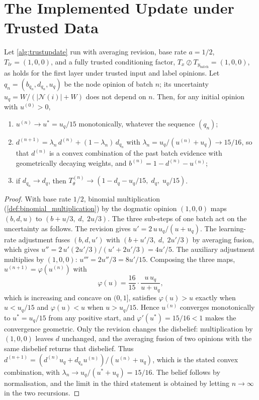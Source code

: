 \section{The Implemented Update under Trusted Data}

\begin{theorem}\label{thm:implemented}
Let \cref{alg:trustupdate} run with averaging revision, base rate $a = 1/2$, $T_{lr} = (1, 0, 0)$, and a fully trusted conditioning factor, $T_x \oslash T_{y_\text{batch}} = (1, 0, 0)$, as holds for the first layer under trusted input and label opinions. Let $q_n = (b_{q_n}, d_{q_n}, u_q)$ be the node opinion of batch $n$; its uncertainty $u_q = W / (|\mathcal{N}(i)| + W)$ does not depend on $n$. Then, for any initial opinion with $u^{(0)} > 0$,
\begin{enumerate}
    \item $u^{(n)} \to u^* = u_q / 15$ monotonically, whatever the sequence $(q_n)$;
    \item $d^{(n+1)} = \lambda_n\, d^{(n)} + (1 - \lambda_n)\, d_{q_n}$ with $\lambda_n = u_q / (u^{(n)} + u_q) \to 15/16$, so that $d^{(n)}$ is a convex combination of the past batch evidence with geometrically decaying weights, and $b^{(n)} = 1 - d^{(n)} - u^{(n)}$;
    \item if $d_{q_n} \to d_q$, then $T_\theta^{(n)} \to (1 - d_q - u_q/15,\; d_q,\; u_q/15)$.
\end{enumerate}
\end{theorem}
\begin{proof}
With base rate $1/2$, binomial multiplication (\cref{def:binomial_multiplication}) by the dogmatic opinion $(1,0,0)$ maps $(b, d, u)$ to $(b + u/3,\; d,\; 2u/3)$. The three sub-steps of one batch act on the uncertainty as follows. The revision gives $u' = 2\, u\, u_q / (u + u_q)$. The learning-rate adjustment fuses $(b, d, u')$ with $(b + u'/3,\; d,\; 2u'/3)$ by averaging fusion, which gives $u'' = 2\, u' (2u'/3) / (u' + 2u'/3) = 4u'/5$. The auxiliary adjustment multiplies by $(1,0,0)$: $u''' = 2u''/3 = 8u'/15$. Composing the three maps, $u^{(n+1)} = \varphi(u^{(n)})$ with
\[
\varphi(u) = \frac{16}{15}\cdot\frac{u\, u_q}{u + u_q},
\]
which is increasing and concave on $(0, 1]$, satisfies $\varphi(u) > u$ exactly when $u < u_q/15$ and $\varphi(u) < u$ when $u > u_q/15$. Hence $u^{(n)}$ converges monotonically to $u^* = u_q/15$ from any positive start, and $\varphi'(u^*) = 15/16 < 1$ makes the convergence geometric. Only the revision changes the disbelief: multiplication by $(1,0,0)$ leaves $d$ unchanged, and the averaging fusion of two opinions with the same disbelief returns that disbelief. Thus $d^{(n+1)} = (d^{(n)} u_q + d_{q_n} u^{(n)}) / (u^{(n)} + u_q)$, which is the stated convex combination, with $\lambda_n \to u_q/(u^* + u_q) = 15/16$. The belief follows by normalisation, and the limit in the third statement is obtained by letting $n \to \infty$ in the two recursions.
\end{proof}

